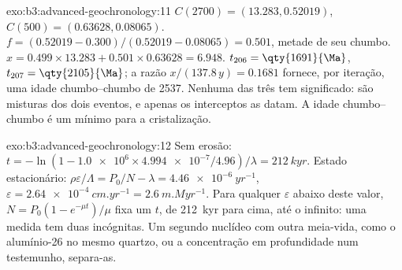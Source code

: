 \begin{solution}{exo:b3:advanced-geochronology:11}
$C(2700) = (13.283, 0.52019)$, $C(500) = (0.63628, 0.08065)$. $f = (0.52019 -
0.300)/(0.52019 - 0.08065) = 0.501$, metade de seu chumbo. $x = 0.499\times13.283 +
0.501\times0.63628 = 6.948$. $t_{206} = \qty{1691}{\Ma}$, $t_{207} =
\qty{2105}{\Ma}$; a razão $x/(137.8\,y) = 0.1681$ fornece, por iteração, uma
idade chumbo--chumbo de \qty{2537}{\Ma}. Nenhuma das três tem significado: são
misturas dos dois eventos, e apenas os interceptos as datam. A idade chumbo--chumbo
é um mínimo para a cristalização.
\end{solution}

\begin{solution}{exo:b3:advanced-geochronology:12}
Sem erosão: $t = -\ln(1 - \num{1.0e6}\times\num{4.994e-7}/4.96)/\lambda =
\qty{212}{kyr}$. Estado estacionário: $\rho\varepsilon/\Lambda = P_0/N - \lambda =
\qty{4.46e-6}{yr^{-1}}$, $\varepsilon = \qty{2.64e-4}{cm.yr^{-1}} =
\qty{2.6}{m.Myr^{-1}}$. Para qualquer $\varepsilon$ abaixo deste valor, $N =
P_0(1 - e^{-\mu t})/\mu$ fixa um $t$, de \qty{212}{kyr} para cima, até
o infinito: uma medida tem duas incógnitas. Um segundo nuclídeo com outra
meia-vida, como o alumínio-26 no mesmo quartzo, ou a concentração
em profundidade num testemunho, separa-as.
\end{solution}

